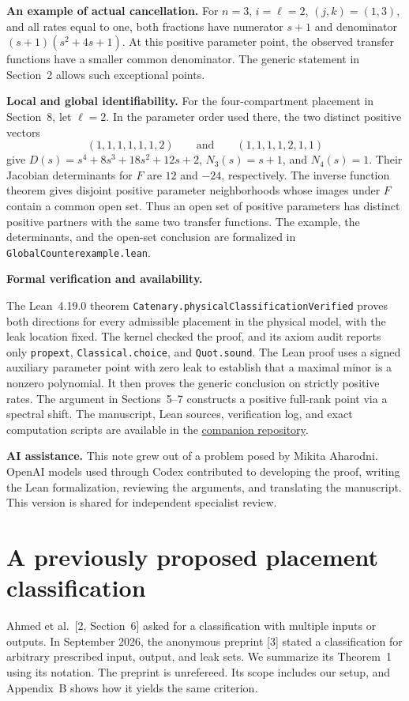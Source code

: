 \documentclass[11pt,a4paper]{article}
\newcommand{\sect}[1]{\section{#1}}
\begin{document}
\smallskip
\noindent\textbf{An example of actual cancellation.}
For \(n=3\), \(i=\ell=2\), \((j,k)=(1,3)\), and all rates equal to one, both fractions have numerator \(s+1\) and denominator \((s+1)(s^2+4s+1)\). At this positive parameter point, the observed transfer functions have a smaller common denominator. The generic statement in Section~2 allows such exceptional points.


\noindent\textbf{Local and global identifiability.}
For the four-compartment placement in Section~8, let \(\ell=2\). In the parameter order used there, the two distinct positive vectors
\[
  (1,1,1,1,1,1,2)\qquad\text{and}\qquad(1,1,1,1,2,1,1)
\]
give \(D(s)=s^4+8s^3+18s^2+12s+2\), \(N_3(s)=s+1\), and \(N_4(s)=1\). Their Jacobian determinants for \(F\) are \(12\) and \(-24\), respectively. The inverse function theorem gives disjoint positive parameter neighborhoods whose images under \(F\) contain a common open set. Thus an open set of positive parameters has distinct positive partners with the same two transfer functions. The example, the determinants, and the open-set conclusion are formalized in \texttt{GlobalCounterexample.lean}.

\noindent\textbf{Formal verification and availability.}\par
The Lean~4.19.0 theorem \texttt{Catenary.}\allowbreak\texttt{physicalClassificationVerified} proves both directions for every admissible placement in the physical model, with the leak location fixed. The kernel checked the proof, and its axiom audit reports only \texttt{propext}, \texttt{Classical.choice}, and \texttt{Quot.sound}. The Lean proof uses a signed auxiliary parameter point with zero leak to establish that a maximal minor is a nonzero polynomial. It then proves the generic conclusion on strictly positive rates. The argument in Sections~5--7 constructs a positive full-rank point via a spectral shift. The manuscript, Lean sources, verification log, and exact computation scripts are available in the
\href{https://github.com/qqhgdkktu/catenary-identifiability}{companion repository}.

\noindent\textbf{AI assistance.}
This note grew out of a problem posed by Mikita Aharodni. OpenAI models used through Codex contributed to developing the proof, writing the Lean formalization, reviewing the arguments, and translating the manuscript. This version is shared for independent specialist review.


\appendix\sect{A previously proposed placement classification}
Ahmed et al.~[2, Section~6] asked for a classification with multiple inputs or outputs. In September 2026, the anonymous preprint [3] stated a classification for arbitrary prescribed input, output, and leak sets. We summarize its Theorem~1 using its notation. The preprint is unrefereed. Its scope includes our setup, and Appendix~B shows how it yields the same criterion.
\end{document}
